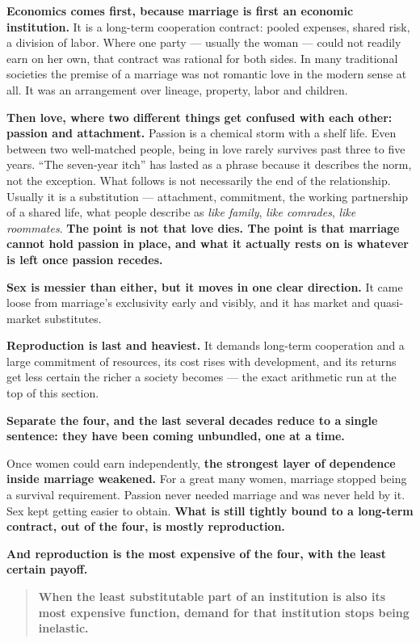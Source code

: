 \documentclass[11pt,a4paper]{article}
\begin{document}
\textbf{Economics comes first, because marriage is first an economic institution.} It is a long-term cooperation contract: pooled expenses, shared risk, a division of labor. Where one party --- usually the woman --- could not readily earn on her own, that contract was rational for both sides. In many traditional societies the premise of a marriage was not romantic love in the modern sense at all. It was an arrangement over lineage, property, labor and children.

\textbf{Then love, where two different things get confused with each other: passion and attachment.} Passion is a chemical storm with a shelf life. Even between two well-matched people, being in love rarely survives past three to five years. ``The seven-year itch'' has lasted as a phrase because it describes the norm, not the exception. What follows is not necessarily the end of the relationship. Usually it is a substitution --- attachment, commitment, the working partnership of a shared life, what people describe as \textit{like family}, \textit{like comrades}, \textit{like roommates}. \textbf{The point is not that love dies. The point is that marriage cannot hold passion in place, and what it actually rests on is whatever is left once passion recedes.}

\textbf{Sex is messier than either, but it moves in one clear direction.} It came loose from marriage's exclusivity early and visibly, and it has market and quasi-market substitutes.

\textbf{Reproduction is last and heaviest.} It demands long-term cooperation and a large commitment of resources, its cost rises with development, and its returns get less certain the richer a society becomes --- the exact arithmetic run at the top of this section.

\textbf{Separate the four, and the last several decades reduce to a single sentence: they have been coming unbundled, one at a time.}

Once women could earn independently, \textbf{the strongest layer of dependence inside marriage weakened.} For a great many women, marriage stopped being a survival requirement. Passion never needed marriage and was never held by it. Sex kept getting easier to obtain. \textbf{What is still tightly bound to a long-term contract, out of the four, is mostly reproduction.}

\textbf{And reproduction is the most expensive of the four, with the least certain payoff.}

\begin{quote}
\textbf{When the least substitutable part of an institution is also its most expensive function, demand for that institution stops being inelastic.}
\end{quote}
\end{document}
